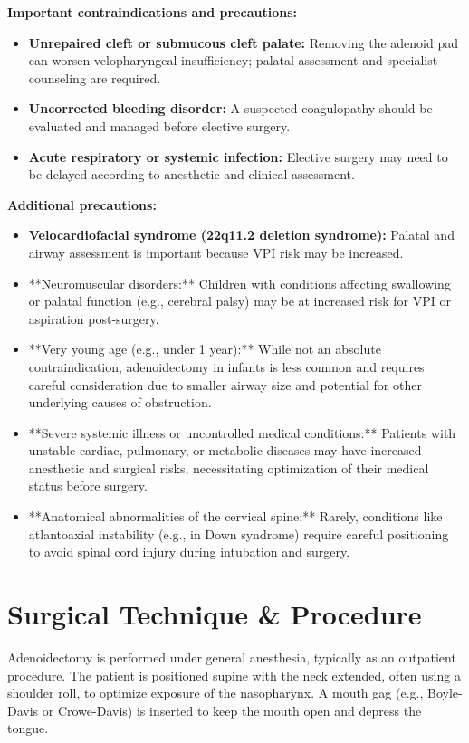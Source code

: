 \textbf{Important contraindications and precautions:}
\begin{itemize}
  \item \textbf{Unrepaired cleft or submucous cleft palate:} Removing the adenoid pad can worsen velopharyngeal insufficiency; palatal assessment and specialist counseling are required.
  \item \textbf{Uncorrected bleeding disorder:} A suspected coagulopathy should be evaluated and managed before elective surgery.
  \item \textbf{Acute respiratory or systemic infection:} Elective surgery may need to be delayed according to anesthetic and clinical assessment.
\end{itemize}

\textbf{Additional precautions:}
\begin{itemize}
  \item \textbf{Velocardiofacial syndrome (22q11.2 deletion syndrome):} Palatal and airway assessment is important because VPI risk may be increased.
  \item **Neuromuscular disorders:** Children with conditions affecting swallowing or palatal function (e.g., cerebral palsy) may be at increased risk for VPI or aspiration post-surgery.
  \item **Very young age (e.g., under 1 year):** While not an absolute contraindication, adenoidectomy in infants is less common and requires careful consideration due to smaller airway size and potential for other underlying causes of obstruction.
  \item **Severe systemic illness or uncontrolled medical conditions:** Patients with unstable cardiac, pulmonary, or metabolic diseases may have increased anesthetic and surgical risks, necessitating optimization of their medical status before surgery.
  \item **Anatomical abnormalities of the cervical spine:** Rarely, conditions like atlantoaxial instability (e.g., in Down syndrome) require careful positioning to avoid spinal cord injury during intubation and surgery.
\end{itemize}

\section*{Surgical Technique \& Procedure}
Adenoidectomy is performed under general anesthesia, typically as an outpatient procedure. The patient is positioned supine with the neck extended, often using a shoulder roll, to optimize exposure of the nasopharynx. A mouth gag (e.g., Boyle-Davis or Crowe-Davis) is inserted to keep the mouth open and depress the tongue.

